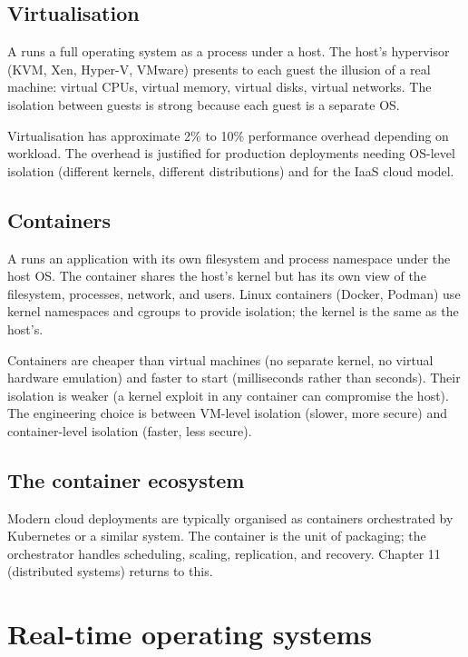 \subsection{Virtualisation}

A  runs a full operating system as a process under a host. The host's hypervisor (KVM, Xen, Hyper-V, VMware) presents to each guest the illusion of a real machine: virtual CPUs, virtual memory, virtual disks, virtual networks. The isolation between guests is strong because each guest is a separate OS.

Virtualisation has approximate 2\% to 10\% performance overhead depending on workload. The overhead is justified for production deployments needing OS-level isolation (different kernels, different distributions) and for the IaaS cloud model.

\subsection{Containers}

A  runs an application with its own filesystem and process namespace under the host OS. The container shares the host's kernel but has its own view of the filesystem, processes, network, and users. Linux containers (Docker, Podman) use kernel namespaces and cgroups to provide isolation; the kernel is the same as the host's.

Containers are cheaper than virtual machines (no separate kernel, no virtual hardware emulation) and faster to start (milliseconds rather than seconds). Their isolation is weaker (a kernel exploit in any container can compromise the host). The engineering choice is between VM-level isolation (slower, more secure) and container-level isolation (faster, less secure).

\subsection{The container ecosystem}

Modern cloud deployments are typically organised as containers orchestrated by Kubernetes or a similar system. The container is the unit of packaging; the orchestrator handles scheduling, scaling, replication, and recovery. Chapter 11 (distributed systems) returns to this.

\section{Real-time operating systems}

